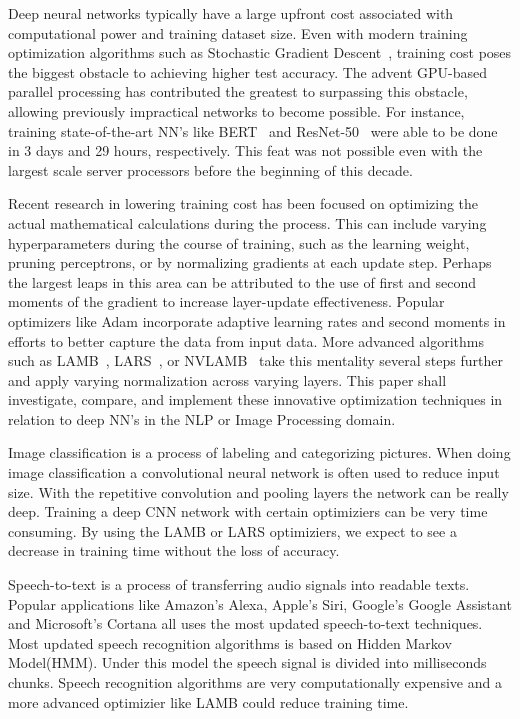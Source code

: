 Deep neural networks typically have a large upfront cost associated with computational power and training dataset size. Even with modern training optimization algorithms such as Stochastic Gradient Descent~\cite{SGD}, training cost poses the biggest obstacle to achieving higher test accuracy. The advent GPU-based parallel processing has contributed the greatest to surpassing this obstacle, allowing previously impractical networks to become possible. For instance, training state-of-the-art NN's like BERT~\cite{bert} and ResNet-50~\cite{resnet} were able to be done in 3 days and 29 hours, respectively. This feat was not possible even with the largest scale server processors before the beginning of this decade. 

Recent research in lowering training cost has been focused on optimizing the actual mathematical calculations during the process. This can include varying hyperparameters during the course of training, such as the learning weight, pruning perceptrons, or by normalizing gradients at each update step. Perhaps the largest leaps in this area can be attributed to the use of first and second moments of the gradient to increase layer-update effectiveness. Popular optimizers like Adam incorporate adaptive learning rates and second moments in efforts to better capture the data from input data. More advanced algorithms such as LAMB~\cite{You2020Large}, LARS~\cite{qian2020impact, ginsburg2018large}, or NVLAMB~\cite{nvidia_nvlamb}  take this mentality several steps further and apply varying normalization across varying layers. This paper shall investigate, compare, and implement these innovative optimization techniques in relation to deep NN's in the NLP or Image Processing domain. 

Image classification is a process of labeling and categorizing pictures. When doing image classification a convolutional neural network is often used to reduce input size. With the repetitive convolution and pooling layers the network can be really deep. Training a deep CNN network with certain optimiziers can be very time consuming. By using the LAMB or LARS optimiziers, we expect to see a decrease in training time without the loss of accuracy.

Speech-to-text is a process of transferring audio signals into readable texts. Popular applications like Amazon’s Alexa, Apple’s Siri, Google’s Google Assistant and Microsoft’s Cortana all uses the most updated speech-to-text techniques. Most updated speech recognition algorithms is based on Hidden Markov Model(HMM). Under this model the speech signal is divided into milliseconds chunks. Speech recognition algorithms are very computationally expensive and a more advanced optimizier like LAMB could reduce training time.


